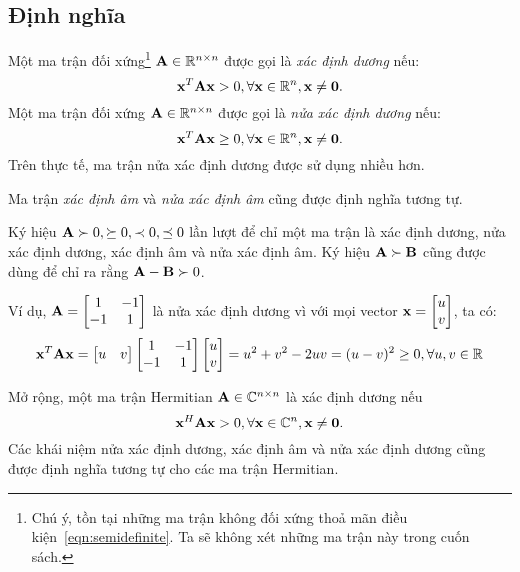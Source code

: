 \subsection{Định nghĩa} %
\label{sub:dinh_nghia}
Một ma trận đối xứng\footnote{Chú ý, tồn tại những ma trận không đối xứng thoả
mãn điều kiện~\eqref{eqn:semidefinite}. Ta sẽ không xét những ma trận này trong cuốn sách.}
$\mathbf{A} \in \mathbb{R}^{n\times n}$ được gọi là \textit{xác định dương} nếu:
\begin{equation}
\label{eqn:semidefinite}
\mathbf{x}^T\mathbf{A}\mathbf{x} > 0, \forall \mathbf{x} \in \mathbb{R}^{n}, \mathbf{x} \neq \mathbf{0}.
\end{equation}
Một ma trận đối xứng $\mathbf{A} \in \mathbb{R}^{n \times n}$ được gọi là \textit{nửa xác định
dương} nếu:
\begin{equation}
\mathbf{x}^T\mathbf{A}\mathbf{x} \geq 0, \forall \mathbf{x} \in \mathbb{R}^{n}, \mathbf{x} \neq \mathbf{0}.
\end{equation}
Trên thực tế, ma trận nửa xác định dương được sử dụng nhiều hơn.


Ma trận \textit{xác định âm} và \textit{nửa xác định âm}  cũng được định nghĩa
tương tự.

Ký hiệu $\mathbf{A} \succ 0, \succeq 0, \prec 0, \preceq 0$ lần lượt để chỉ một ma trận
là xác định dương, nửa xác định dương, xác định âm và nửa xác định âm. Ký hiệu
$\mathbf{A} \succ \mathbf{B}$ cũng được dùng để chỉ ra rằng $\mathbf{A} - \mathbf{B}
\succ 0$.

Ví dụ, $\mathbf{A} = \left[\begin{matrix} 1 & -1 \\ -1 & 1\end{matrix}\right]$ là nửa xác định dương vì với mọi vector
$\mathbf{x} = \left[\begin{matrix} u \\ v \end{matrix}\right]$, ta có:
\begin{equation}
\mathbf{x}^T \mathbf{A}\mathbf{x} = \left[\begin{matrix} u & v \end{matrix}\right] \left[\begin{matrix} 1 & -1 \\ -1 & 1\end{matrix}\right] \left[\begin{matrix} u \\ v \end{matrix}\right] =
u^2 + v^2 - 2uv = (u - v)^2 \geq 0, \forall u, v \in \mathbb{R}
\end{equation}

Mở rộng, một ma trận Hermitian $\mathbf{A} \in \mathbb{C}^{n\times n}$ là xác định dương nếu
\begin{equation}
\mathbf{x}^H\mathbf{A}\mathbf{x} > 0, \forall \mathbf{x} \in \mathbb{C}^{n}, \mathbf{x} \neq \mathbf{0}.
\end{equation}
Các khái niệm nửa xác định dương, xác định âm và nửa xác định dương cũng được
định nghĩa tương tự cho các ma trận Hermitian.
